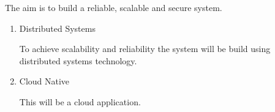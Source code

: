 The aim is to build a reliable, scalable and secure system.

\begin{enumerate}
    \item Distributed Systems

          To achieve scalability and reliability the system will be build using distributed systems technology.

    \item Cloud Native

          This will be a cloud application.
\end{enumerate}